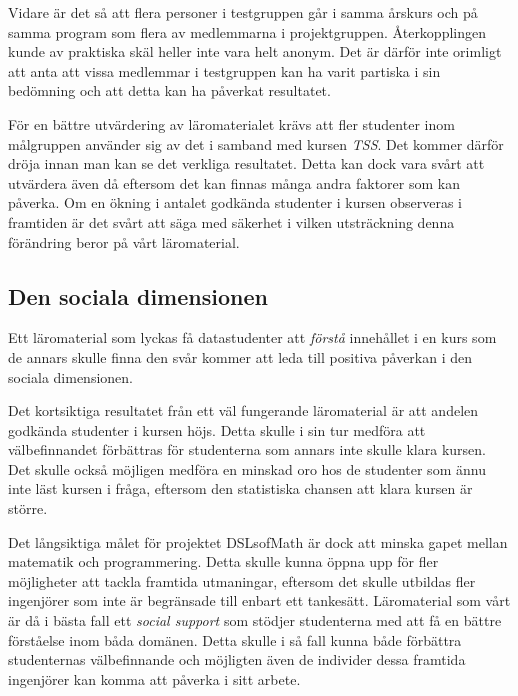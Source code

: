 \documentclass[]{article}
\begin{document}
Vidare är det så att flera personer i testgruppen går i samma årskurs
och på samma program som flera av medlemmarna i
projektgruppen. Återkopplingen kunde av praktiska skäl heller inte
vara helt anonym. Det är därför inte orimligt att anta att vissa
medlemmar i testgruppen kan ha varit partiska i sin bedömning och att
detta kan ha påverkat resultatet.

För en bättre utvärdering av läromaterialet krävs att fler studenter
inom målgruppen använder sig av det i samband med kursen
\textit{TSS}. Det kommer därför dröja innan man kan se det verkliga
resultatet. Detta kan dock vara svårt att utvärdera även då eftersom
det kan finnas många andra faktorer som kan påverka. Om en ökning i
antalet godkända studenter i kursen observeras i framtiden är det
svårt att säga med säkerhet i vilken utsträckning denna förändring
beror på vårt läromaterial.


\subsection{Den sociala dimensionen}

Ett läromaterial som lyckas få datastudenter att \emph{förstå}
innehållet i en kurs som de annars skulle finna den svår kommer att leda
till positiva påverkan i den sociala dimensionen. %

Det kortsiktiga resultatet från ett väl fungerande läromaterial är att andelen godkända
studenter i kursen höjs. Detta skulle i sin tur medföra att välbefinnandet
förbättras för studenterna som annars inte skulle klara kursen.
Det skulle också möjligen medföra en minskad oro hos de
studenter som ännu inte läst kursen i fråga, eftersom
den statistiska chansen att klara kursen är större.

Det långsiktiga målet för projektet DSLsofMath är dock att minska gapet
mellan matematik och programmering. %
Detta skulle kunna öppna upp för fler möjligheter att tackla framtida
utmaningar, eftersom det skulle utbildas fler ingenjörer som inte är
begränsade till enbart ett tankesätt.
Läromaterial som vårt är då i bästa fall ett \emph{social support} som stödjer studenterna
med att få en bättre förståelse inom båda domänen. Detta skulle i så fall kunna både 
förbättra studenternas välbefinnande och möjligten även de individer dessa framtida ingenjörer kan komma att påverka i sitt arbete.
\end{document}

